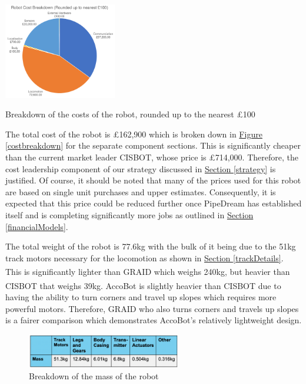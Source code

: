 \documentclass[11pt]{article}		%
\newcommand{\supercite}[1]{\textsuperscript{\cite{#1}}}		%
\newcommand{\figref}[1]{\hyperref[#1]{Figure \ref*{#1}}}    %
\newcommand{\sectref}[1]{\hyperref[#1]{Section \ref*{#1}}}     %
\begin{document}
   		    \begin{floatingfigure}[r]{0.4\textwidth}
				\centering
				\includegraphics[width=0.37\textwidth]{costBreakdown}
				\caption{Breakdown of the costs of the robot, rounded up to the nearest £100}
				\label{costbreakdown}
			\end{floatingfigure}
   		    The total cost of the robot is £162,900 which is broken down in \figref{costbreakdown} for the separate component sections. This is significantly cheaper than the current market leader CISBOT, whose price is £714,000. Therefore, the cost leadership component of our strategy discussed in \sectref{strategy} is justified. 
         Of course, it should be noted that many of the prices used for this robot are based on single unit purchases and upper estimates. Consequently, it is expected that this price could be reduced further once PipeDream has established itself and is completing significantly more jobs as outlined in \sectref{financialModels}. 

		 \begin{floatingfigure}[r]{0pt} \end{floatingfigure}  

        \hspace*{3ex}The total weight of the robot is 77.6kg with the bulk of it being due to the 51kg track motors necessary for the locomotion as shown in \sectref{trackDetails}. This is significantly lighter than GRAID which weighs 240kg\supercite{graidweight}, but heavier than CISBOT that weighs 39kg\supercite{cisbotweight}. AccoBot is slightly heavier than CISBOT due to having the ability to turn corners and travel up slopes which requires more powerful motors. Therefore, GRAID who also turns corners and travels up slopes is a fairer comparison which demonstrates AccoBot's relatively lightweight design. 
            \begin{figure}[h]
				\centering
				\includegraphics[width=0.6\textwidth]{weightsbreaks.png}
				\caption{Breakdown of the mass of the robot}
				\label{massbreakdown}
			\end{figure}
        
\end{document}
